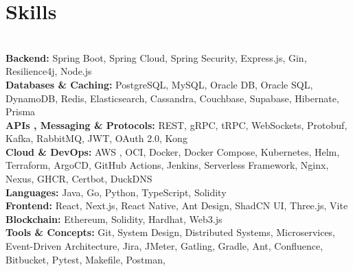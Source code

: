 \section*{Skills}
\BigDivider\\
\small
\noindent\textbf{Backend:} Spring Boot, Spring Cloud, Spring Security, Express.js, Gin, Resilience4j, Node.js\\[0.2em]
\textbf{Databases \& Caching:} PostgreSQL, MySQL, Oracle DB, Oracle SQL, DynamoDB, Redis, Elasticsearch, Cassandra, Couchbase, Supabase, Hibernate, Prisma\\[0.2em]
\textbf{APIs , Messaging \& Protocols:} REST, gRPC, tRPC, WebSockets, Protobuf, Kafka, RabbitMQ, JWT, OAuth 2.0, Kong\\[0.2em]
\textbf{Cloud \& DevOps:} AWS , OCI, Docker, Docker Compose, Kubernetes, Helm, Terraform, ArgoCD, GitHub Actions, Jenkins, Serverless Framework, Nginx, Nexus, GHCR, Certbot, DuckDNS\\[0.2em]
\textbf{Languages:} Java, Go, Python, TypeScript, Solidity\\[0.2em]
\textbf{Frontend:} React, Next.js, React Native, Ant Design, ShadCN UI, Three.js, Vite\\[0.2em]
\textbf{Blockchain:} Ethereum, Solidity, Hardhat, Web3.js\\[0.2em]
\textbf{Tools \& Concepts:} Git, System Design, Distributed Systems, Microservices, Event-Driven Architecture, Jira, JMeter, Gatling, Gradle, Ant, Confluence, Bitbucket, Pytest, Makefile, Postman, 
\normalsize
